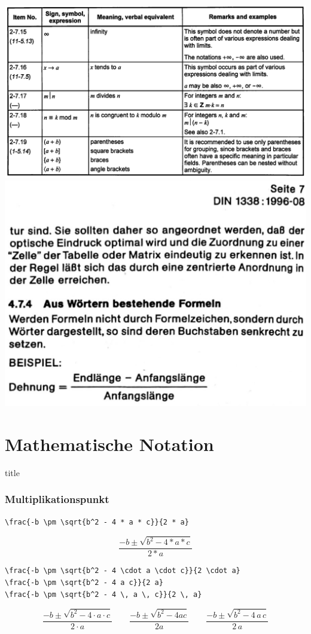\documentclass[handout]{beamer}
\makeatletter
\newcommand\sectiontitlepage{
    \miniframesoff
    \begin{frame}
        \vfill
        \centering
        \begin{beamercolorbox}[sep=8pt,center,shadow=true,rounded=true]{title}
            \usebeamerfont{title}\insertsectionhead\par%
        \end{beamercolorbox}
        \vfill
    \end{frame}
    \miniframeson
}
\let\beamer@writeslidentry@miniframeson=\beamer@writeslidentry
\def\beamer@writeslidentry@miniframesoff{%
    \expandafter\beamer@ifempty\expandafter{\beamer@framestartpage}{}%
    {%
        \clearpage\beamer@notesactions%
    }
}
\newcommand*{\miniframeson}{\let\beamer@writeslidentry=\beamer@writeslidentry@miniframeson}
\newcommand*{\miniframesoff}{\let\beamer@writeslidentry=\beamer@writeslidentry@miniframesoff}
\makeatother
\begin{document}
\begin{frame}[fragile]
    \includegraphics[height=0.32\textwidth]{images/iso-extract}\hfill
    \includegraphics[height=0.32\textwidth]{images/din-extract}
\end{frame}

\section{Mathematische Notation}

\sectiontitlepage

\begin{frame}[fragile]
    \frametitle{Multiplikationspunkt}
    \begin{wrong}
        \begin{lstlisting}
\frac{-b \pm \sqrt{b^2 - 4 * a * c}}{2 * a}
        \end{lstlisting}
    \end{wrong}
    \pause
    \begin{wrong}
        \begin{equation*}
            \frac{-b \pm \sqrt{b^2 - 4 * a * c}}{2 * a}
        \end{equation*}
    \end{wrong}
    \pause
    \begin{lstlisting}
\frac{-b \pm \sqrt{b^2 - 4 \cdot a \cdot c}}{2 \cdot a}
\frac{-b \pm \sqrt{b^2 - 4 a c}}{2 a}
\frac{-b \pm \sqrt{b^2 - 4 \, a \, c}}{2 \, a}
    \end{lstlisting}

    \begin{equation*}
        \frac{-b \pm \sqrt{b^2 - 4 \cdot a \cdot c}}{2 \cdot a}
        \qquad
        \frac{-b \pm \sqrt{b^2 - 4 a c}}{2 a}
        \qquad
        \frac{-b \pm \sqrt{b^2 - 4 \, a \, c}}{2 \, a}
    \end{equation*}
    \pause
\end{frame}
\end{document}
